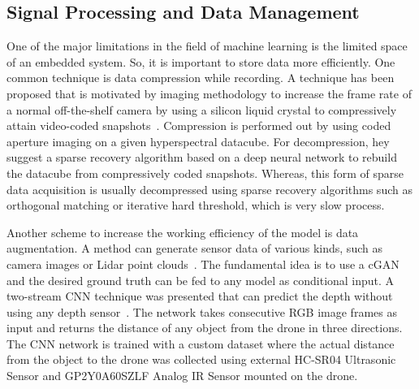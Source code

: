 \subsection{Signal Processing and Data Management}
One of the major limitations in the field of machine learning is the limited space of an embedded system. So, it is important to store data more efficiently. One common technique is data compression while recording. 
A technique has been proposed that is motivated by \cite{hitomi2011video} imaging methodology to increase the frame rate of a normal off-the-shelf camera by using a silicon liquid crystal to compressively attain video-coded snapshots~\cite{kumar2018onboard}. Compression is performed out by using coded aperture imaging on a given hyperspectral datacube. For decompression, hey suggest a sparse recovery algorithm based on a deep neural network to rebuild the datacube from compressively coded snapshots. Whereas, this form of sparse data acquisition is usually decompressed using  sparse recovery algorithms such as orthogonal matching or iterative hard threshold, which is very slow process.

Another scheme to increase the working efficiency of the model is data augmentation. A method can generate sensor data of various kinds, such as camera images or Lidar point clouds~\cite{milz2018aerial}. The fundamental idea is to use a cGAN and the desired ground truth can be fed to any model as conditional input.
A two-stream CNN technique was presented that can predict the depth without using any depth sensor~\cite{kouris2018learning}. The network takes consecutive RGB image frames as input and returns the distance of any object from the drone in three directions. The CNN network is trained with a custom dataset where the actual distance from the object to the drone was collected using external HC-SR04 Ultrasonic Sensor and GP2Y0A60SZLF Analog IR Sensor mounted on the drone.